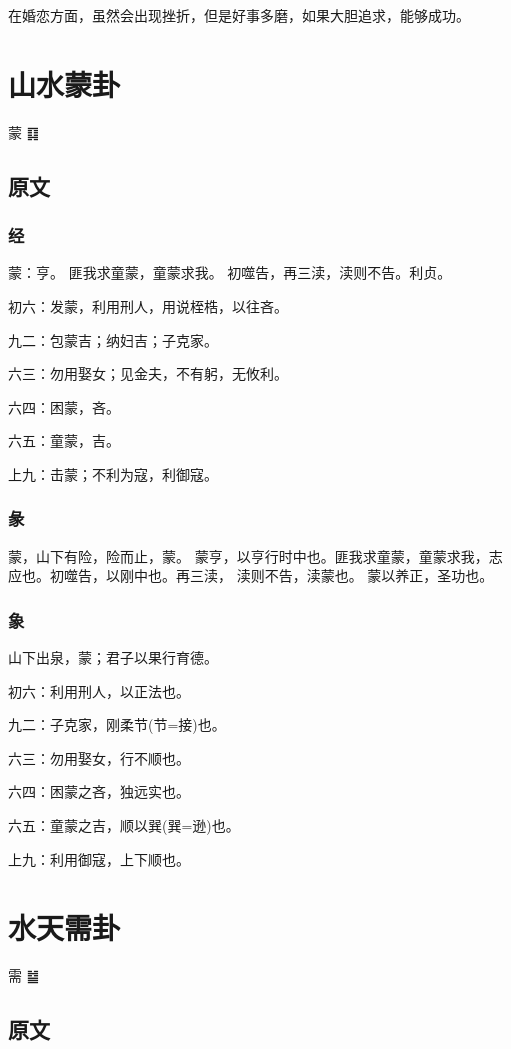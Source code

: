 \documentclass[12pt,oneside]{book}
\begin{document}
在婚恋方面，虽然会出现挫折，但是好事多磨，如果大胆追求，能够成功。



\chapter{山水蒙卦}
蒙 {\Large ䷃}

\section{原文}
\subsection{经}
蒙：亨。 匪我求童蒙，童蒙求我。 初噬告，再三渎，渎则不告。利贞。

初六：发蒙，利用刑人，用说桎梏，以往吝。

九二：包蒙吉；纳妇吉；子克家。

六三：勿用娶女；见金夫，不有躬，无攸利。

六四：困蒙，吝。

六五：童蒙，吉。

上九：击蒙；不利为寇，利御寇。

\subsection{彖}
蒙，山下有险，险而止，蒙。 蒙亨，以亨行时中也。匪我求童蒙，童蒙求我，志应也。初噬告，以刚中也。再三渎， 渎则不告，渎蒙也。 蒙以养正，圣功也。


\subsection{象}
山下出泉，蒙；君子以果行育德。

初六：利用刑人，以正法也。

九二：子克家，刚柔节(节=接)也。

六三：勿用娶女，行不顺也。

六四：困蒙之吝，独远实也。

六五：童蒙之吉，顺以巽(巽=逊)也。

上九：利用御寇，上下顺也。


\chapter{水天需卦}
需 {\Large ䷄}

\section{原文}
\end{document}
